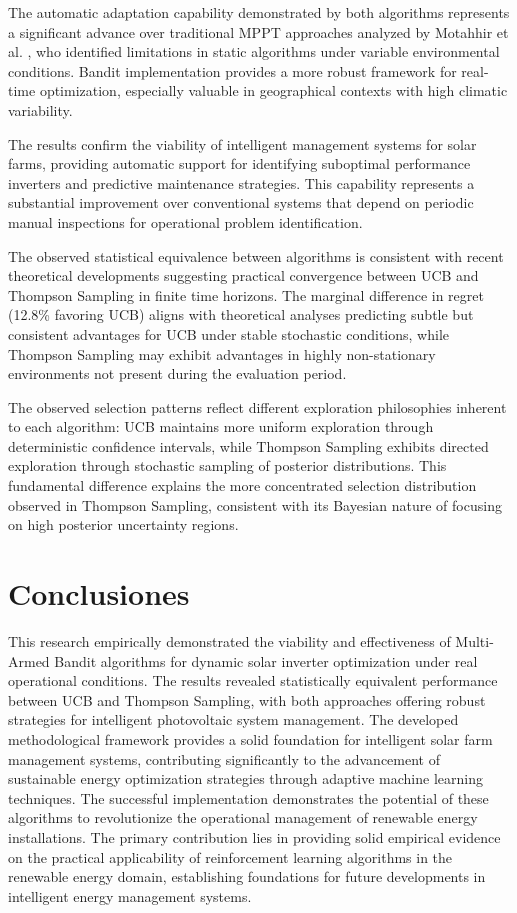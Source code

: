 \documentclass[conference]{IEEEtran}
\begin{document}
The automatic adaptation capability demonstrated by both algorithms represents a significant advance over traditional MPPT approaches analyzed by Motahhir et al. \cite{motahhir2020}, who identified limitations in static algorithms under variable environmental conditions. Bandit implementation provides a more robust framework for real-time optimization, especially valuable in geographical contexts with high climatic variability.

The results confirm the viability of intelligent management systems for solar farms, providing automatic support for identifying suboptimal performance inverters and predictive maintenance strategies. This capability represents a substantial improvement over conventional systems that depend on periodic manual inspections for operational problem identification.

The observed statistical equivalence between algorithms is consistent with recent theoretical developments suggesting practical convergence between UCB and Thompson Sampling in finite time horizons. The marginal difference in regret (12.8\% favoring UCB) aligns with theoretical analyses predicting subtle but consistent advantages for UCB under stable stochastic conditions, while Thompson Sampling may exhibit advantages in highly non-stationary environments not present during the evaluation period.

The observed selection patterns reflect different exploration philosophies inherent to each algorithm: UCB maintains more uniform exploration through deterministic confidence intervals, while Thompson Sampling exhibits directed exploration through stochastic sampling of posterior distributions. This fundamental difference explains the more concentrated selection distribution observed in Thompson Sampling, consistent with its Bayesian nature of focusing on high posterior uncertainty regions.



\section{Conclusiones}

This research empirically demonstrated the viability and effectiveness of Multi-Armed Bandit algorithms for dynamic solar inverter optimization under real operational conditions. The results revealed statistically equivalent performance between UCB and Thompson Sampling, with both approaches offering robust strategies for intelligent photovoltaic system management.
The developed methodological framework provides a solid foundation for intelligent solar farm management systems, contributing significantly to the advancement of sustainable energy optimization strategies through adaptive machine learning techniques. The successful implementation demonstrates the potential of these algorithms to revolutionize the operational management of renewable energy installations.
The primary contribution lies in providing solid empirical evidence on the practical applicability of reinforcement learning algorithms in the renewable energy domain, establishing foundations for future developments in intelligent energy management systems.
\end{document}
